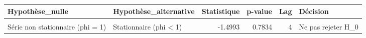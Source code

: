 \centering
\centering
\begin{tabular}[t]{llrrrl}
\toprule
Hypothèse\_nulle & Hypothèse\_alternative & Statistique & p-value & Lag & Décision\\
\midrule
\cellcolor{gray!10}{Série non stationnaire (phi = 1)} & \cellcolor{gray!10}{Explosive (phi > 1)} & \cellcolor{gray!10}{-1.4993} & \cellcolor{gray!10}{0.2166} & \cellcolor{gray!10}{4} & \cellcolor{gray!10}{Ne pas rejeter H\_0}\\
Série non stationnaire (phi = 1) & Stationnaire (phi < 1) & -1.4993 & 0.7834 & 4 & Ne pas rejeter H\_0\\
\bottomrule
\end{tabular}

